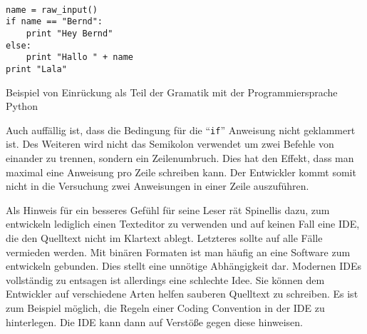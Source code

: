 \begin{listing}[H]
    \begin{verbatim}
    
name = raw_input()
if name == "Bernd":
    print "Hey Bernd"
else:
    print "Hallo " + name
print "Lala"
	\end{verbatim}
    \label{paper2:pythongrama}
    \caption{Beispiel von Einrückung als Teil der Gramatik mit der Programmiersprache Python}
\end{listing}


Auch auffällig ist, dass die Bedingung für die \enquote{\texttt{if}} Anweisung nicht geklammert ist. Des Weiteren wird nicht das Semikolon verwendet um zwei Befehle von einander zu trennen, sondern ein Zeilenumbruch. Dies hat den Effekt, dass man maximal eine Anweisung pro Zeile schreiben kann. Der Entwickler kommt somit nicht in die Versuchung zwei Anweisungen in einer Zeile auszuführen.

Als Hinweis für ein besseres Gefühl für seine Leser rät Spinellis dazu, zum entwickeln lediglich einen Texteditor zu verwenden und auf keinen Fall eine IDE, die den Quelltext nicht im Klartext ablegt. Letzteres sollte auf alle Fälle vermieden werden. Mit binären Formaten ist man häufig an eine Software zum entwickeln gebunden. Dies stellt eine unnötige Abhängigkeit dar. Modernen IDEs vollständig zu entsagen ist allerdings eine schlechte Idee. Sie können dem Entwickler auf verschiedene Arten helfen sauberen Quelltext zu schreiben. Es ist zum Beispiel möglich, die Regeln einer Coding Convention in der IDE zu hinterlegen. Die IDE kann dann auf Verstöße gegen diese hinweisen.


